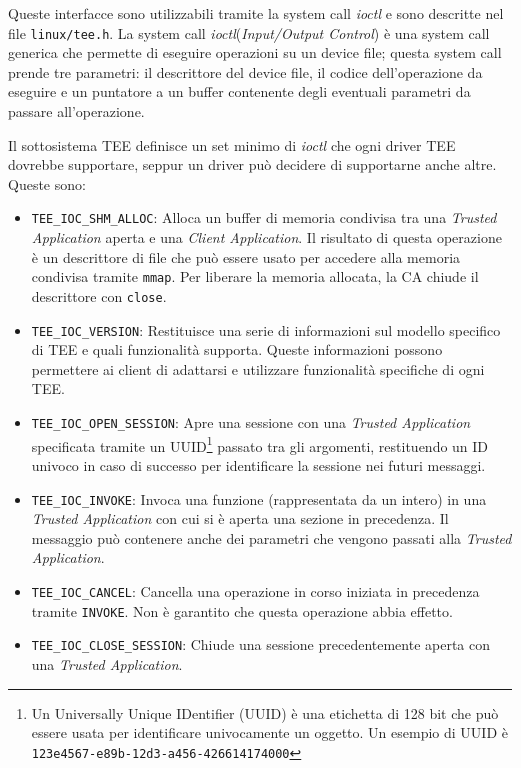 \documentclass[12pt,italian]{report}
\begin{document}
Queste interfacce sono utilizzabili tramite la system call \textit{ioctl}
e sono descritte nel file \texttt{linux/tee.h}.
La system call \textit{ioctl}(\textit{Input/Output Control})
è una system call generica che permette di
eseguire operazioni su un device file; questa system call
prende tre parametri:
il descrittore del device file, il codice dell'operazione da eseguire e
un puntatore a un buffer contenente degli eventuali parametri da passare
all'operazione.

Il sottosistema TEE definisce un set minimo di \textit{ioctl} che ogni
driver TEE dovrebbe supportare, seppur un driver può decidere di
supportarne anche altre.
Queste sono:
\begin{itemize}
    \item \texttt{TEE\_IOC\_SHM\_ALLOC}:
        Alloca un buffer di memoria condivisa tra una
        \textit{Trusted Application} aperta e una
        \textit{Client Application}.
        Il risultato di questa operazione è un descrittore
        di file che può essere usato per accedere alla memoria condivisa
        tramite \texttt{mmap}.
        Per liberare la memoria allocata, la CA chiude il descrittore con
        \texttt{close}. 

    \item \texttt{TEE\_IOC\_VERSION}:
        Restituisce una serie di informazioni sul modello specifico di TEE e
        quali funzionalità supporta.
        Queste informazioni possono permettere ai client di adattarsi e
        utilizzare funzionalità specifiche di ogni TEE.

    \item \texttt{TEE\_IOC\_OPEN\_SESSION}:
        Apre una sessione con una \textit{Trusted Application} specificata
        tramite un UUID\footnote{
            Un Universally Unique IDentifier (UUID) è una etichetta di 128 bit
            che può essere usata per identificare univocamente un oggetto.
            Un esempio di UUID è \texttt{123e4567-e89b-12d3-a456-426614174000}
        } passato tra gli argomenti, restituendo
        un ID univoco in caso di successo per identificare la sessione nei
        futuri messaggi.

    \item \texttt{TEE\_IOC\_INVOKE}:
        Invoca una funzione (rappresentata da un intero) in una
        \textit{Trusted Application} con cui si è aperta una sezione
        in precedenza.
        Il messaggio può contenere anche dei parametri che vengono passati
        alla \textit{Trusted Application}.

    \item \texttt{TEE\_IOC\_CANCEL}:
        Cancella una operazione in corso iniziata in precedenza tramite
        \texttt{INVOKE}.
        Non è garantito che questa operazione abbia effetto.

    \item \texttt{TEE\_IOC\_CLOSE\_SESSION}:
        Chiude una sessione precedentemente aperta con una
        \textit{Trusted Application}.
\end{itemize}
\end{document}
